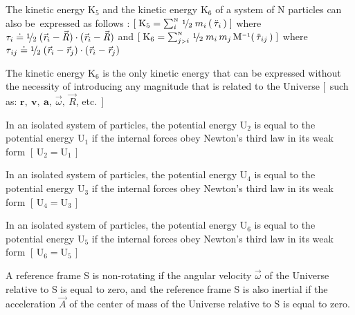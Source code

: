 \documentclass[10pt]{article}
\newcommand{\med}{\raise.5ex\hbox{$\scriptstyle 1$}\kern-.15em/\kern-.09em\lower.25ex\hbox{$\scriptstyle 2$}}
\begin{document}
\par \bigskip\smallskip \noindent The kinetic energy ${\mathrm{K}}_5$ and the kinetic energy ${\mathrm{K}}_6$ of a system of N particles can also \hbox {be expressed} as follows : $[ \; {\mathrm{K}}_5 = \sum_i^{\scriptscriptstyle{\mathrm{N}}} \, \med \; m_i \, ( \, {\ddot{\tau}}_{\hspace{+0.045em}i} \, ) \; ]$ where ${\tau}_{i} \doteq \med \; ({\vec{\mathit{r}}}_{i} - {\vec{\mathit{R}}}) \cdot ({\vec{\mathit{r}}}_{i} - {\vec{\mathit{R}}})$ and \hbox {$[ \; {\mathrm{K}}_6 = \sum_{j{\scriptscriptstyle >}i}^{\scriptscriptstyle{\mathrm{N}}} \, \med \; m_i \, m_j \, {\mathrm{M}}^{\scriptscriptstyle -1} ( \, {\ddot{\tau}}_{\hspace{+0.060em}ij} \, ) \; ]$} where ${\tau}_{\hspace{+0.060em}ij} \doteq \med \; ({\vec{\mathit{r}}}_{i} - {\vec{\mathit{r}}}_{j}) \cdot ({\vec{\mathit{r}}}_{i} - {\vec{\mathit{r}}}_{j})$

\par \bigskip\smallskip \noindent The kinetic energy ${\mathrm{K}}_6$ is the only kinetic energy that can be expressed without the necessity of introducing any magnitude that is related to the Universe $[ \:\: $such as\hspace{+0.060em}: ${\mathbf{r}},\: {\mathbf{v}},\: {\mathbf{a}},\: {\vec{\omega}},\: {\vec{\mathit{R}}}$, etc.$ \:\: ]$

\par \bigskip\smallskip \noindent In an isolated system of particles, the potential energy ${\mathrm{U}}_2$ is equal to the potential energy ${\mathrm{U}}_1$ if the internal forces obey Newton's third law in its weak form $[ \, {\mathrm{U}}_2 = {\mathrm{U}}_1 \, ]$

\par \bigskip\smallskip \noindent In an isolated system of particles, the potential energy ${\mathrm{U}}_4$ is equal to the potential energy ${\mathrm{U}}_3$ if the internal forces obey Newton's third law in its weak form $[ \, {\mathrm{U}}_4 = {\mathrm{U}}_3 \, ]$

\par \bigskip\smallskip \noindent In an isolated system of particles, the potential energy ${\mathrm{U}}_6$ is equal to the potential energy ${\mathrm{U}}_5$ if the internal forces obey Newton's third law in its weak form $[ \, {\mathrm{U}}_6 = {\mathrm{U}}_5 \, ]$

\par \bigskip\smallskip \noindent A reference frame S is non-rotating if the angular velocity ${\vec{\omega}}$ of the Universe relative to S is equal to zero, and the reference frame S is also inertial if the acceleration ${\vec{\mathit{A}}}$ of the center of mass of the Universe relative to S is equal to zero.
\end{document}
